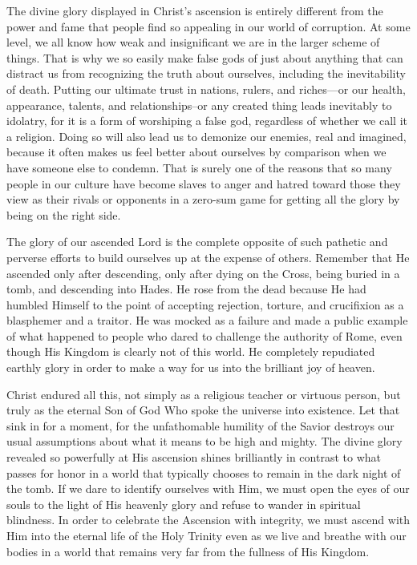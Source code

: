 \documentclass[twoside, letterpaper, 12pt]{report}
\begin{document}
\begin{maybetwocolumns}
The divine glory displayed in Christ’s ascension is entirely different from the power and fame that
people find so appealing in our world of corruption. At some level, we all know how weak and
insignificant we are in the larger scheme of things. That is why we so easily make false gods of
just about anything that can distract us from recognizing the truth about ourselves, including the
inevitability of death. Putting our ultimate trust in nations, rulers, and riches—or our health,
appearance, talents, and relationships–or any created thing leads inevitably to idolatry, for it is a
form of worshiping a false god, regardless of whether we call it a religion. Doing so will also lead
us to demonize our enemies, real and imagined, because it often makes us feel better about
ourselves by comparison when we have someone else to condemn. That is surely one of the
reasons that so many people in our culture have become slaves to anger and hatred toward those
they view as their rivals or opponents in a zero-sum game for getting all the glory by being on the
right side.

The glory of our ascended Lord is the complete opposite of such pathetic and perverse efforts to
build ourselves up at the expense of others. Remember that He ascended only after descending,
only after dying on the Cross, being buried in a tomb, and descending into Hades. He rose from
the dead because He had humbled Himself to the point of accepting rejection, torture, and
crucifixion as a blasphemer and a traitor. He was mocked as a failure and made a public example
of what happened to people who dared to challenge the authority of Rome, even though His
Kingdom is clearly not of this world. He completely repudiated earthly glory in order to make a
way for us into the brilliant joy of heaven.

Christ endured all this, not simply as a religious teacher or virtuous person, but truly as the eternal
Son of God Who spoke the universe into existence. Let that sink in for a moment, for the
unfathomable humility of the Savior destroys our usual assumptions about what it means to be
high and mighty. The divine glory revealed so powerfully at His ascension shines brilliantly in
contrast to what passes for honor in a world that typically chooses to remain in the dark night of
the tomb. If we dare to identify ourselves with Him, we must open the eyes of our souls to the
light of His heavenly glory and refuse to wander in spiritual blindness. In order to celebrate the
Ascension with integrity, we must ascend with Him into the eternal life of the Holy Trinity even
as we live and breathe with our bodies in a world that remains very far from the fullness of His
Kingdom.


\end{maybetwocolumns}
\end{document}
